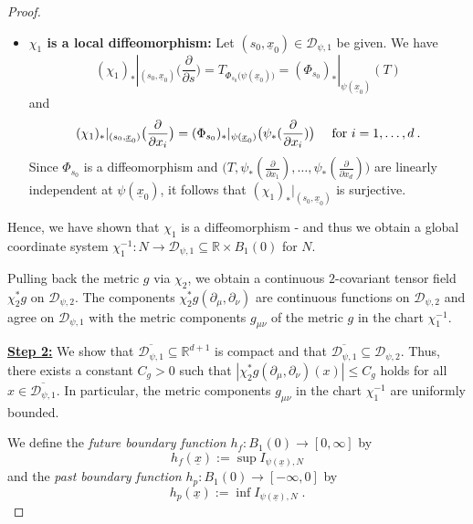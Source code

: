 \documentclass[reqno]{article}
\newcommand{\R}{\mathbb{R}}
\newcommand{\D}{\mathcal{D}}
\newcommand{\ux}{\underline{x}}
\begin{document}
\begin{proof}
\begin{itemize}
\item \textbf{$\chi_1$ is a local diffeomorphism:} Let $(s_0, \ux_0) \in \D_{\psi, 1}$ be given. We have
\begin{equation*}
(\chi_1)_* |_{(s_0,\ux_0)} \big(\frac{\partial}{\partial s}\big) = T_{\Phi_{s_0}\big(\psi(\ux_0)\big)} = (\Phi_{s_0})_*|_{\psi(\ux_0)} (T)
\end{equation*}
and
\begin{equation*}
(\chi_1)_*|_{(s_0,\ux_0)}\big(\frac{\partial}{\partial x_i} \big) = (\Phi_{s_0})_*|_{\psi(\ux_0)} \big(\psi_*(\frac{\partial}{\partial x_i}) \big) \quad \textnormal{ for } i= 1, \ldots, d \:.
\end{equation*}
Since $\Phi_{s_0}$ is a diffeomorphism and $\big(T, \psi_*(\frac{\partial}{\partial x_1}), \ldots, \psi_*(\frac{\partial}{\partial x_d})\big)$ are linearly independent at $\psi(\ux_0)$, it follows that $(\chi_1)_*|_{(s_0, \ux_0)}$ is surjective.
\end{itemize}
Hence,  we have shown that $\chi_1$ is a diffeomorphism - and thus we obtain a global coordinate system $\chi_1^{-1} : N \to \D_{\psi, 1} \subseteq \R \times B_1(0)$ for $N$.

Pulling back the metric $g$ via $\chi_2$, we obtain a continuous $2$-covariant tensor field $\chi_2^*g$ on $\D_{\psi,2}$. The components $\chi_2^*g(\partial_\mu, \partial_\nu)$ are continuous functions on $\D_{\psi,2}$ and agree on $\D_{\psi,1}$ with the metric components $g_{\mu \nu}$ of the metric $g$ in the chart $\chi_1^{-1}$.
\vspace*{2mm}

\underline{\textbf{Step 2:}} We show that $\overline{\D_{\psi,1}} \subseteq \R^{d+1}$ is compact and that $\overline{\D_{\psi,1}}  \subseteq \D_{\psi, 2}$. Thus, there exists a constant $C_g >0$ such that  $|\chi_2^*g(\partial_\mu, \partial_\nu) (x)| \leq C_g$ holds for all $x \in \overline{\D_{\psi, 1}}$. In particular, the metric components $g_{\mu \nu}$ in the chart $\chi_1^{-1}$ are uniformly bounded.
\vspace*{2mm}

We define the \emph{future boundary function} $h_f : B_1(0) \to [0, \infty] $ by
\begin{equation*}
h_f(\ux) := \sup I_{\psi(\ux),N}
\end{equation*}
and the \emph{past boundary function} $h_p : B_1(0) \to [-\infty, 0] $ by
\begin{equation*}
h_p(\ux) := \inf I_{\psi(\ux),N}\;.
\end{equation*}





\end{proof}
\end{document}

